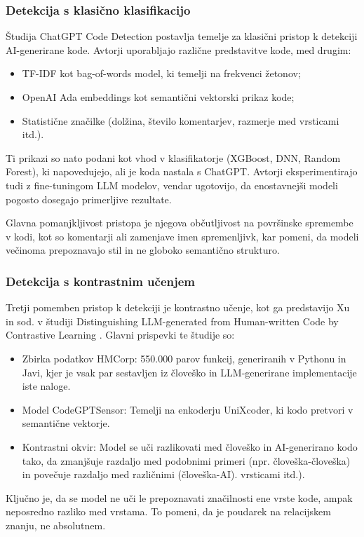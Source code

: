 \documentclass[sigconf,nonacm]{acmart}
\begin{document}
\subsubsection{Detekcija s klasično klasifikacijo}
Študija ChatGPT Code Detection \cite{oedingen2024chatgpt} postavlja temelje za klasični pristop k detekciji AI-generirane kode. Avtorji uporabljajo različne predstavitve kode, med drugim:
\begin{itemize}
	\item TF-IDF kot bag-of-words model, ki temelji na frekvenci žetonov;
	\item OpenAI Ada embeddings kot semantični vektorski prikaz kode;
	\item Statistične značilke (dolžina, število komentarjev, razmerje med vrsticami itd.).
\end{itemize}
Ti prikazi so nato podani kot vhod v klasifikatorje (XGBoost, \acrshort{DNN}, Random Forest), ki napovedujejo, ali je koda nastala s ChatGPT. Avtorji eksperimentirajo tudi z fine-tuningom \acrshort{LLM} modelov, vendar ugotovijo, da enostavnejši modeli pogosto dosegajo primerljive rezultate.

Glavna pomanjkljivost pristopa je njegova občutljivost na površinske spremembe v kodi, kot so komentarji ali zamenjave imen spremenljivk, kar pomeni, da modeli večinoma prepoznavajo stil in ne globoko semantično strukturo.

\subsubsection{Detekcija s kontrastnim učenjem}
Tretji pomemben pristop k detekciji je kontrastno učenje, kot ga predstavijo Xu in sod. v študiji Distinguishing LLM-generated from Human-written Code by Contrastive Learning\cite{xu2024distinguishing} . Glavni prispevki te študije so:
\begin{itemize}
	\item Zbirka podatkov HMCorp: 550.000 parov funkcij, generiranih v Pythonu in Javi, kjer je vsak par sestavljen iz človeško in LLM-generirane implementacije iste naloge.
	\item Model CodeGPTSensor: Temelji na enkoderju UniXcoder, ki kodo pretvori v semantične vektorje.
	\item Kontrastni okvir: Model se uči razlikovati med človeško in AI-generirano kodo tako, da zmanjšuje razdaljo med podobnimi primeri (npr. človeška-človeška) in povečuje razdaljo med različnimi (človeška-AI). vrsticami itd.).
\end{itemize}
Ključno je, da se model ne uči le prepoznavati značilnosti ene vrste kode, ampak neposredno razliko med vrstama. To pomeni, da je poudarek na relacijskem znanju, ne absolutnem.
\end{document}
